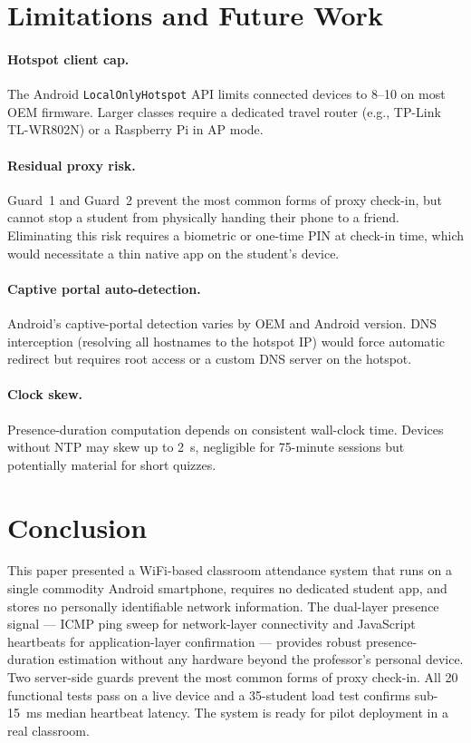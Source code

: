 \documentclass[sigconf,nonacm]{acmart}
\begin{document}
\section{Limitations and Future Work}

\paragraph{Hotspot client cap.}
The Android \texttt{LocalOnlyHotspot} API limits connected devices to
8--10 on most OEM firmware.  Larger classes require a dedicated travel
router (e.g., TP-Link TL-WR802N) or a Raspberry Pi in AP mode.

\paragraph{Residual proxy risk.}
Guard~1 and Guard~2 prevent the most common forms of proxy check-in,
but cannot stop a student from physically handing their phone to a
friend.  Eliminating this risk requires a biometric or one-time PIN at
check-in time, which would necessitate a thin native app on the
student's device.

\paragraph{Captive portal auto-detection.}
Android's captive-portal detection varies by OEM and Android version.
DNS interception (resolving all hostnames to the hotspot IP) would
force automatic redirect but requires root access or a custom DNS
server on the hotspot.

\paragraph{Clock skew.}
Presence-duration computation depends on consistent wall-clock time.
Devices without NTP may skew up to 2~s, negligible for 75-minute
sessions but potentially material for short quizzes.

\section{Conclusion}

This paper presented a WiFi-based classroom attendance system that runs
on a single commodity Android smartphone, requires no dedicated student
app, and stores no personally identifiable network information.  The
dual-layer presence signal --- ICMP ping sweep for network-layer
connectivity and JavaScript heartbeats for application-layer
confirmation --- provides robust presence-duration estimation without
any hardware beyond the professor's personal device.  Two server-side
guards prevent the most common forms of proxy check-in.  All 20
functional tests pass on a live device and a 35-student load test
confirms sub-15~ms median heartbeat latency.  The system is ready for
pilot deployment in a real classroom.
\end{document}
